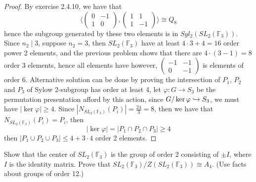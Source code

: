 \documentclass{article}
\newcommand{\F}{\mathbb{F}}
\newenvironment{problem}[2][Problem]{\begin{trivlist}
\item[\hskip \labelsep {\bfseries #1}\hskip \labelsep {\bfseries #2.}]}{\end{trivlist}}
\begin{document}
\begin{proof}
    By exercise 2.4.10, we have that 
    \[
    \bigg\langle\begin{pmatrix}
    0 & -1 \\
    1 & 0
    \end{pmatrix}
    ,
    \begin{pmatrix}
    1 & 1 \\
    1 & -1
    \end{pmatrix}
    \bigg\rangle \cong Q_8
    \]
    hence the subgroup generated by these two elements is in $Syl_2(SL_2(\F_3))$. Since $n_2 \mid 3$, suppose $n_2=3$, then $SL_2(\F_3)$ have at least $4 \cdot 3 +4=16$ order power 2 elements, and the previous problem shows that there are $4\cdot(3-1)=8$ order $3$ elements, hence all elements have however, $\begin{pmatrix}
        -1 & -1 \\
        0 & -1
    \end{pmatrix}$ is elements of order 6.
    Alternative solution can be done by proving the intersection of $P_1$, $P_2$ and $P_3$ of Sylow 2-subgroup has order at least 4, let $\varphi: G \rightarrow S_3$ be the permutation presentation afford by this action, since $G/\ker \varphi \xhookrightarrow{} S_3$, we must have $|\ker\varphi|\geq 4$. Since $|N_{SL_2(\F_3)}(P_i)|=\frac{24}{3}=8$, then we have that $N_{SL_2(\F_3)}(P_i)=P_i$, then 
    \[
        |\ker \varphi| = |P_1 \cap P_2 \cap P_3|\geq 4
    \]
    then $|P_1\cup P_2 \cup P_3|\leq 4 +3 \cdot 4$ order 2 elements. 
\end{proof}
\begin{problem}{11}
    Show that the center of $SL_2(\mathbb{F}_3)$ is the group of order 2 consisting of $\pm I$, where $I$ is the identity matrix.  
    Prove that $SL_2(\mathbb{F}_3) / Z(SL_2(\mathbb{F}_3)) \cong A_4$.  
    (Use facts about groups of order 12.)
\end{problem}
\end{document}
